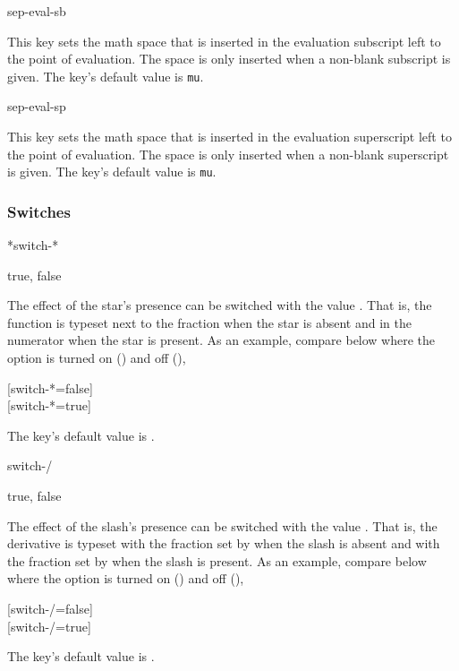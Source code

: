 \documentclass[final,british,10pt]{scrartcl}
\theoremstyle{remark}
\begin{document}
	\begin{option}{sep-eval-sb}
		\begin{values}[default = 0]
		\end{values}
		This key sets the math space that is inserted in the evaluation subscript left to the point of evaluation. The space is only inserted when a non-blank subscript is given. The key's default value is  \texttt{mu}.
	\end{option}
	
	\begin{option}{sep-eval-sp}
		\begin{values}[default = 0]
		\end{values}
		This key sets the math space that is inserted in the evaluation superscript left to the point of evaluation. The space is only inserted when a non-blank superscript is given. The key's default value is  \texttt{mu}.
	\end{option}
	
	\subsubsection*{Switches}
	
	\begin{option}*{switch-*}
		\begin{values}[default = false]
			true, false
		\end{values}
		The effect of the star's presence can be switched with the value . That is, the function is typeset next to the fraction when the star is absent and in the numerator when the star is present. As an example, compare below where the option is turned on () and off (),
		
		\begin{example}
			\derivset{\odv}[switch-*=false]  \\
			\derivset{\odv}[switch-*=true]  
		\end{example}
		
		\noindent The key's default value is \default.
	\end{option}
	
	\begin{option}{switch-/}
		\begin{values}[default = false]
			true, false
		\end{values}
		The effect of the slash's presence can be switched with the value . That is, the derivative is typeset with the fraction set by  when the slash is absent and with the fraction set by  when the slash is present. As an example, compare below where the option is turned on () and off (\val{false}),
		
		\begin{example}
			\derivset{\odv}[switch-/=false] \odv{y}{x} \\
			\derivset{\odv}[switch-/=true]  \odv{y}{x}
		\end{example}
		
		\noindent The key's default value is .
	\end{option}
	
\end{document}
